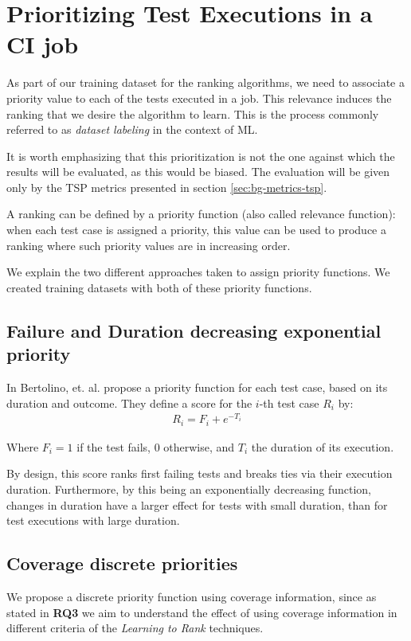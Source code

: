 \section{Prioritizing Test Executions in a CI job}\label{s:method-prioritizing-testruns}

As part of our training dataset for the ranking algorithms, we need to associate a priority value
to each of the tests executed in a job. This relevance induces the ranking that we desire the algorithm to 
learn. This is the process commonly referred to as \emph{dataset labeling} in the context of ML.

It is worth emphasizing that this prioritization is not the one against which the results
will be evaluated, as this would be biased. The evaluation will be given only by the 
TSP metrics presented in section \ref{sec:bg-metrics-tsp}.

A ranking can be defined by a priority function (also called relevance function): when each 
test case is assigned a priority, this value can be used to produce a ranking where such 
priority values are in increasing order.

We explain the two different approaches taken to assign priority functions. We created training datasets with both of these priority functions.

\subsection{Failure and Duration decreasing exponential priority}

In \cite{Bertolino2020LearningtoRankVR} Bertolino, et. al. propose a priority function for each test case, based on its duration and outcome.
They define a score for the $i$-th test case $R_i$ by:
\begin{align*}
R_i = F_i + e^{-T_i}
\end{align*}

Where $F_i = 1$ if the test fails, $0$ otherwise, and $T_i$ the duration of its execution.

By design, this score ranks first failing tests and breaks ties via their execution duration.
Furthermore, by this being an exponentially decreasing function, changes
in duration have a larger effect for tests with small duration, than for test executions with
large duration.

\subsection{Coverage discrete priorities}\label{s:method-prioritizingtestcases}
We propose a discrete priority function using coverage information, since as stated in \textbf{RQ3}
we aim to understand the effect of using coverage information in different criteria of the
\emph{Learning to Rank} techniques.

